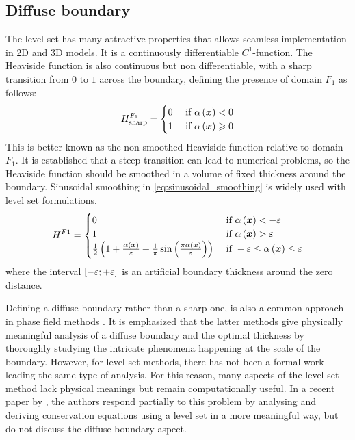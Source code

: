 \subsection{Diffuse boundary} \label{sec:heaviside}
The level set has many attractive properties that allows seamless implementation in 2D and 3D models. 
It is a continuously differentiable $C^1$-function. 
The Heaviside function is also continuous but non differentiable, with a sharp transition from $0$ to $1$ 
across the boundary, defining the presence of domain $F_1$ as follows:
\begin{align}
\label{eq:no_smoothing}
H_\text{sharp}^{F_1}= 
\begin{cases}
	0  & \text{ if } \alpha \left( \boldsymbol{x} \right) < 0 \\
    1  & \text{ if } \alpha \left( \boldsymbol{x} \right) \geqslant 0 \\  
\end{cases}
\end{align}
This is better known as the non-smoothed Heaviside function relative to domain $F_1$.
It is established that a steep transition can lead to numerical problems, 
so the Heaviside function should be smoothed in a volume of fixed thickness around the boundary.
Sinusoidal smoothing in \cref{eq:sinusoidal_smoothing} is widely used with level set formulations.
\begin{align}
\label{eq:sinusoidal_smoothing}
H^{F1} =
\begin{cases}
	0  & \text{ if } \alpha \left( \boldsymbol{x} \right) < -\varepsilon \\
    1  & \text{ if } \alpha \left( \boldsymbol{x} \right) > \varepsilon \\  
    \frac{1}{2} \left( 1+ \frac{\alpha \left( \boldsymbol{x} \right)}{\varepsilon} 
    + \frac{1}{\pi}\sin \left( \frac{\pi \alpha \left( \boldsymbol{x} \right)}{\varepsilon } \right)  \right) & \text{ if } - \varepsilon \leq \alpha \left( \boldsymbol{x} \right) \leq \varepsilon
\end{cases}
\end{align}
where the interval $\left[ -\varepsilon; +\varepsilon \right]$ is an artificial boundary thickness around the zero distance.

Defining a diffuse boundary rather than a sharp one, is also a common approach 
in phase field methods \citep{beckermann_modeling_1999,sun_diffuse_2004}.
It is emphasized that the latter methods give physically meaningful 
analysis of a diffuse boundary and the optimal thickness by thoroughly studying the 
intricate phenomena happening at the scale of the boundary. However, for level set methods, 
there has not been a formal work leading the same type of analysis. For this reason, 
many aspects of the level set method lack physical meanings but remain computationally useful.
In a recent paper by \citet{gada_derivation_2009}, the authors respond partially to this problem 
by analysing and deriving conservation equations using a level set in a more meaningful way, but 
do not discuss the diffuse boundary aspect.


